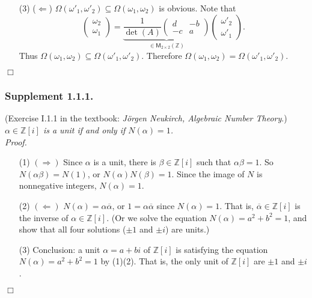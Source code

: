 \documentclass{article}
\begin{document}
\begin{enumerate}
\item[(3)]
  ($\Longleftarrow$)
  $\Omega(\omega'_1,\omega'_2) \subseteq \Omega(\omega_1,\omega_2)$ is obvious.
  Note that
  \[
    \begin{pmatrix}
      \omega_2 \\
      \omega_1
    \end{pmatrix}
    =
    \underbrace{\frac{1}{\det(A)}
    \begin{pmatrix}
      d & -b \\
      -c & a
    \end{pmatrix}}_{\in \mathsf{M}_{2 \times 2}(\mathbb{Z})}
    \begin{pmatrix}
      \omega'_2 \\
      \omega'_1
    \end{pmatrix}.
  \]
  Thus $\Omega(\omega_1,\omega_2) \subseteq \Omega(\omega'_1,\omega'_2)$.
  Therefore $\Omega(\omega_1,\omega_2) = \Omega(\omega'_1,\omega'_2)$.
\end{enumerate}
$\Box$ \\



\subsubsection*{Supplement 1.1.1.}
(Exercise I.1.1 in the textbook: \emph{J\"orgen Neukirch, Algebraic Number Theory}.)
\emph{$\alpha \in \mathbb{Z}[i]$ is a unit if and only if $N(\alpha) = 1$.} \\



\emph{Proof.}
\begin{enumerate}
\item[(1)]
  \emph{$(\Longrightarrow)$}
  Since $\alpha$ is a unit, there is $\beta \in \mathbb{Z}[i]$ such that
  $\alpha \beta = 1$.
  So $N(\alpha \beta) = N(1)$, or $N(\alpha) N(\beta) = 1$.
  Since the image of $N$ is nonnegative integers, $N(\alpha) = 1$.

\item[(2)]
  \emph{$(\Longleftarrow)$}
  $N(\alpha) = \alpha \overline{\alpha}$,
  or $1 = \alpha \overline{\alpha}$ since $N(\alpha) = 1$.
  That is, $\overline{\alpha} \in \mathbb{Z}[i]$ is
  the inverse of $\alpha \in \mathbb{Z}[i]$.
  (Or we solve the equation $N(\alpha) = a^2 + b^2 = 1$,
  and show that all four solutions ($\pm 1$ and $\pm i$) are units.)

\item[(3)]
  Conclusion: a unit $\alpha = a+bi$ of $\mathbb{Z}[i]$
  is satisfying the equation $N(\alpha) = a^2 + b^2 = 1$ by (1)(2).
  That is, the only unit of $\mathbb{Z}[i]$ are $\pm 1$ and $\pm i$.
\end{enumerate}
$\Box$ \\\\
\end{document}
